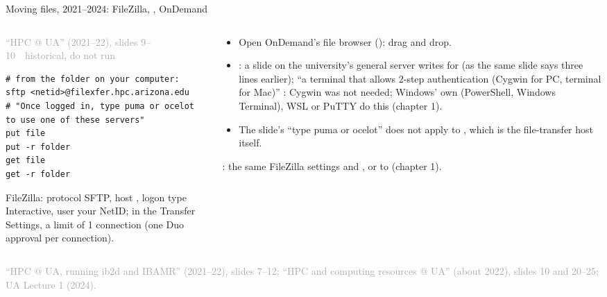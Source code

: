 \documentclass[aspectratio=169,11pt]{beamer}
\newcommand{\sourcecredit}[1]{\vfill\begin{flushright}\tiny\textcolor{DarkGray}{#1}\end{flushright}}
\newcommand{\hist}[1]{{\tiny\sffamily\textcolor{DarkGray}{#1\ \textbullet\ historical, do not run}}\par\nointerlineskip\vspace{0.3mm}}
\begin{document}
\begin{frame}[fragile]{Moving files, 2021--2024: FileZilla, , OnDemand}
\label{fr:uafiles}
\begin{columns}[T,onlytextwidth]
\begin{column}{0.5\textwidth}
\hist{``HPC @ UA'' (2021--22), slides 9--10}
\begin{lstlisting}[style=hist]
# from the folder on your computer:
sftp <netid>@filexfer.hpc.arizona.edu
# "Once logged in, type puma or ocelot to use one of these servers"
put file
put -r folder
get file
get -r folder
\end{lstlisting}
\footnotesize FileZilla: protocol SFTP, host , logon type Interactive, user your NetID; in the Transfer Settings, a limit of 1 connection (one Duo approval per connection).
\end{column}
\begin{column}{0.47\textwidth}
\footnotesize
\begin{itemize}\setlength{\itemsep}{2pt}
  \item Open OnDemand's file browser (): drag and drop.
  \item {}: a slide on the university's general server writes  for  (as the same slide says three lines earlier); ``a terminal that allows 2-step authentication (Cygwin for PC, terminal for Mac)'' : Cygwin was not needed; Windows' own  (PowerShell, Windows Terminal), WSL or PuTTY do this (chapter 1).
  \item The  slide's ``type puma or ocelot'' does not apply to , which is the file-transfer host itself.
\end{itemize}
\vspace{1mm}
: the same FileZilla settings and ,  or  to  (chapter 1).
\end{column}
\end{columns}
\sourcecredit{``HPC @ UA, running ib2d and IBAMR'' (2021--22), slides 7--12; ``HPC and computing resources @ UA'' (about 2022), slides 10 and 20--25; UA Lecture 1 (2024).}
\end{frame}
\end{document}
